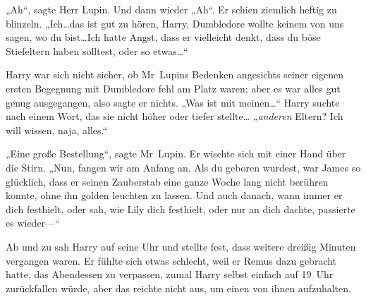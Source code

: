 „Ah“, sagte Herr Lupin. Und dann wieder „Ah“. Er schien ziemlich heftig zu blinzeln. „Ich…das ist gut zu hören, Harry, Dumbledore wollte keinem von uns sagen, wo du bist…Ich hatte Angst, dass er vielleicht denkt, dass du böse Stiefeltern haben solltest, oder so etwas…“

Harry war sich nicht sicher, ob Mr~Lupins Bedenken angesichts seiner eigenen ersten Begegnung mit Dumbledore fehl am Platz waren; aber es war alles gut genug ausgegangen, also sagte er nichts. „Was ist mit meinen…“ Harry suchte nach einem Wort, das sie nicht höher oder tiefer stellte… „\emph{anderen} Eltern? Ich will wissen, naja, alles.“

„Eine große Bestellung“, sagte Mr~Lupin. Er wischte sich mit einer Hand über die Stirn. „Nun, fangen wir am Anfang an. Als du geboren wurdest, war James so glücklich, dass er seinen Zauberstab eine ganze Woche lang nicht berühren konnte, ohne ihn golden leuchten zu lassen. Und auch danach, wann immer er dich festhielt, oder sah, wie Lily dich festhielt, oder nur an dich dachte, passierte es wieder—“

\later

Ab und zu sah Harry auf seine Uhr und stellte fest, dass weitere dreißig Minuten vergangen waren. Er fühlte sich etwas schlecht, weil er Remus dazu gebracht hatte, das Abendessen zu verpassen, zumal Harry selbst einfach auf 19~Uhr zurückfallen würde, aber das reichte nicht aus, um einen von ihnen aufzuhalten.


